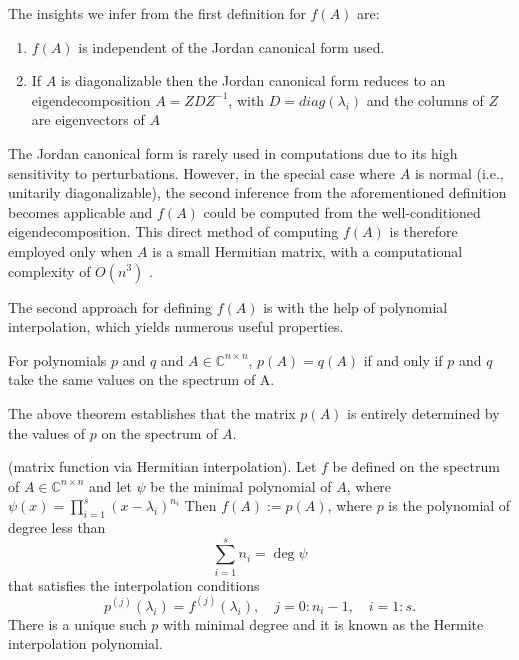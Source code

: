 The insights we infer from the first definition for $f(A)$ are:
\begin{enumerate}
    \item $f(A)$ is independent of the Jordan canonical form used.
    \item If $A$ is diagonalizable then the Jordan canonical form reduces to an eigendecomposition $A=ZDZ^{-1}$, with $D=diag(\lambda_i)$ and the columns of $Z$ are eigenvectors of $A$
    \end{enumerate}
    
The Jordan canonical form is rarely used in computations due to its high sensitivity to perturbations. However, in the special case where \( A \) is normal (i.e., unitarily diagonalizable), the second inference from the aforementioned definition becomes applicable and $f(A)$ could be computed from the well-conditioned eigendecomposition. This direct method of computing $f(A)$ is therefore employed only when $A$ is a small Hermitian matrix, with a computational complexity of \( O(n^3) \) \cite{8}. 

The second approach for defining $f(A)$ is with the help of polynomial interpolation, which yields numerous useful properties.

\begin{theorem}
    \label{the:2.4}
    \cite{8}For polynomials $p$ and $q$ and $A \in \mathbb{C}^{n \times n}$, $p(A) = q(A)$ if and only if $p$ and $q$  take the same values on the spectrum of A.
\end{theorem}

The above theorem establishes that the matrix $p(A)$ is entirely determined by the values of $p$ on the spectrum of $A$.

\begin{definition}
    \label{def:2.5}
    \cite{8}(matrix function via Hermitian interpolation). Let $f$ be defined on the spectrum of $A \in \mathbb{C}^{n \times n}$ and let $\psi$ be the minimal polynomial of $A$, where $\psi(x)=\prod^{s}_{i=1}(x-\lambda_{i})^{n_{i}}$ Then $f(A) := p(A)$, where $p$ is the polynomial of degree less than
    \[
        \sum_{i=1}^{s} n_i = \deg \psi
    \]
    that satisfies the interpolation conditions
    \begin{equation}
        p^{(j)}(\lambda_i) = f^{(j)}(\lambda_i), \quad j=0:n_i-1, \quad i=1:s.
        \label{eq:2.5}
    \end{equation}
     There is a unique such $p$ with minimal degree and it is known as the Hermite interpolation polynomial.
\end{definition}

